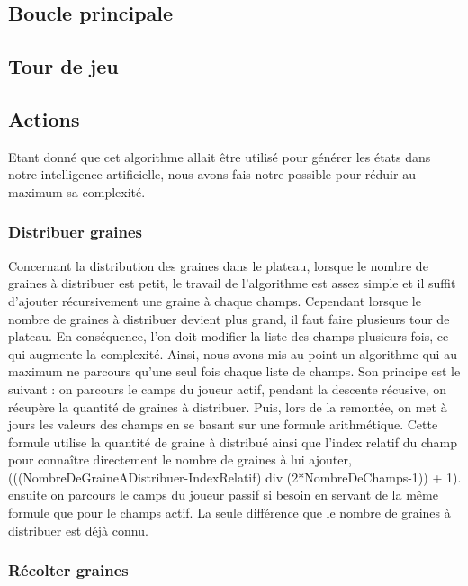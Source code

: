 \documentclass[]{article}
\begin{document}
\subsection{Boucle principale}

\subsection{Tour de jeu}



\subsection{Actions}

Etant donné que cet algorithme allait être utilisé pour générer les états dans notre intelligence artificielle, nous avons fais notre possible pour réduir au maximum sa complexité.

\subsubsection{Distribuer graines}

	Concernant la distribution des graines dans le plateau, lorsque le nombre de graines à distribuer est petit, le travail de l'algorithme est assez simple et il suffit d'ajouter récursivement une graine à chaque champs.
Cependant lorsque le nombre de graines à distribuer devient plus grand, il faut faire plusieurs tour de plateau. En conséquence, l'on doit modifier la liste des champs plusieurs fois, ce qui augmente la complexité.
Ainsi, nous avons mis au point un algorithme qui au maximum ne parcours qu'une seul fois chaque liste de champs.
Son principe est le suivant :
	on parcours le camps du joueur actif, pendant la descente récusive, on récupère la quantité de graines à distribuer. Puis, lors de la remontée, on met à jours les valeurs des champs en se basant sur une formule arithmétique. Cette formule utilise la quantité de graine à distribué ainsi que l'index relatif du champ pour connaître directement le nombre de graines à lui ajouter, (((NombreDeGraineADistribuer-IndexRelatif) div (2*NombreDeChamps-1)) + 1).
	ensuite on parcours le camps du joueur passif si besoin en servant de la même formule que pour le champs actif. La seule différence que le nombre de graines à distribuer est déjà connu.

\subsubsection{Récolter graines}
\end{document}
